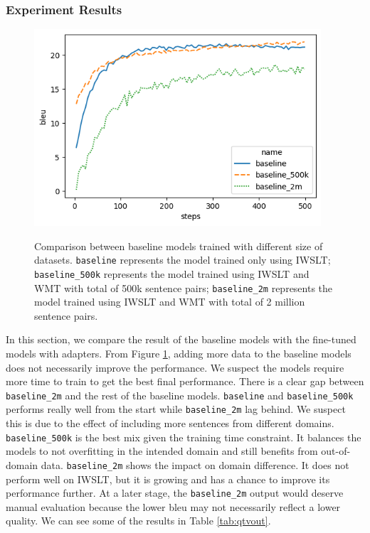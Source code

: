 \subsubsection{Experiment Results}
\begin{figure}[h]
    {\includegraphics[width=0.95\textwidth]{img/baseline.png}}
    \centering
    \caption{
        Comparison between baseline models trained with different size of datasets. \texttt{baseline} represents the model trained only using IWSLT; \texttt{baseline\_500k} represents the model trained using IWSLT and WMT with total of 500k sentence pairs; \texttt{baseline\_2m} represents the model trained using IWSLT and WMT with total of 2 million sentence pairs.}
    \label{img:basecomp}
\end{figure}

In this section, we compare the result of the baseline models with the fine-tuned models with adapters. From Figure \ref{img:basecomp}, adding more data to the baseline models does not necessarily improve the performance. We suspect the models require more time to train to get the best final performance. There is a clear gap between \texttt{baseline\_2m} and the rest of the baseline models. \texttt{baseline} and \texttt{baseline\_500k} performs really well from the start while \texttt{baseline\_2m} lag behind. We suspect this is due to the effect of including more sentences from different domains. \texttt{baseline\_500k} is the best mix given the training time constraint. It balances the models to not overfitting in the intended domain and still benefits from out-of-domain data. \texttt{baseline\_2m} shows the impact on domain difference. It does not perform well on IWSLT, but it is growing and has a chance to improve its performance further. At a later stage, the \texttt{baseline\_2m} output would deserve manual evaluation because the lower bleu may not necessarily reflect a lower quality. We can see some of the results in Table \ref{tab:qtvout}.

